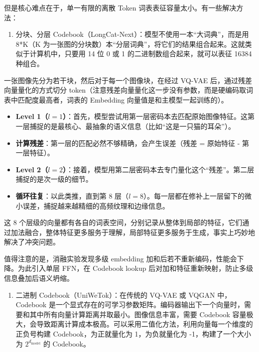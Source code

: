 但是核心难点在于，单一有限的离散 Token 词表表征容量太小。有一些解决方法：

\begin{enumerate}
\def\labelenumi{\arabic{enumi}.}
\tightlist
\item
  分块、分层 Codebook（LongCat-Next）：模型不使用一本``大词典''，而是用 8*K（K 为一张图的分块数）本``分层词典''，将它们的结果组合起来。这就类似于计算机中，只要用 14 位 0 或 1 的二进制数组合起来，就可以表征 16384 种组合。
\end{enumerate}

一张图像先分为若干块，然后对于每一个图像块，在经过 VQ-VAE 后，通过残差向量量化的方式切分 token（注意残差向量量化这一步没有参数，而是硬编码取词表中匹配度最高者，词表的 Embedding 向量值是和主模型一起训练的）。

\begin{itemize}
\tightlist
\item
  \textbf{Level 1（\(l=1\)）}：首先，模型尝试用第一层密码本去匹配原始图像特征。这第一层捕捉的是最核心、最抽象的语义信息（比如``这是一只猫的耳朵''）。
\item
  \textbf{计算残差}：第一层的匹配必然不够精确，会产生误差（残差 = 原始特征 - 第一层特征）。
\item
  \textbf{Level 2（\(l=2\)）}：接着，模型用第二层密码本去专门量化这个``残差''。第二层捕捉的是次一级的细节。
\item
  \textbf{循环往复}：以此类推，直到第 8 层（\(l=8\)）。每一层都在修补上一层留下的微小误差，捕捉越来越精细的高频纹理和边缘信息。
\end{itemize}

这 8 个层级的向量都有各自的词表空间，分别记录从整体到局部的特征，它们通过加法融合，整体特征更多服务于理解，局部特征更多服务于生成，事实上巧妙地解决了冲突问题。

值得注意的是，消融实验发现多级 embedding 加和后若不重新编码，性能会下降。为此引入单层 FFN，在 Codebook lookup 后对加和特征重新映射，防止多级信息叠加后语义坍缩。

\begin{enumerate}
\def\labelenumi{\arabic{enumi}.}
\setcounter{enumi}{1}
\tightlist
\item
  二进制 Codebook（UniWeTok）：在传统的 VQ-VAE 或 VQGAN 中，Codebook 是一个显式存在的可学习参数矩阵。编码器输出下一个向量时，需要和其中所有向量计算距离并取最小。图像信息丰富，需要 Codebook 容量极大，会导致距离计算成本极高。可以采用二值化方法，利用向量每一个维度的正负号构建 Codebook，为正就量化为 1，为负就量化为 -1，构建了一个大小为 \(2^{d_{\mathrm{model}}}\) 的 Codebook。
\end{enumerate}

